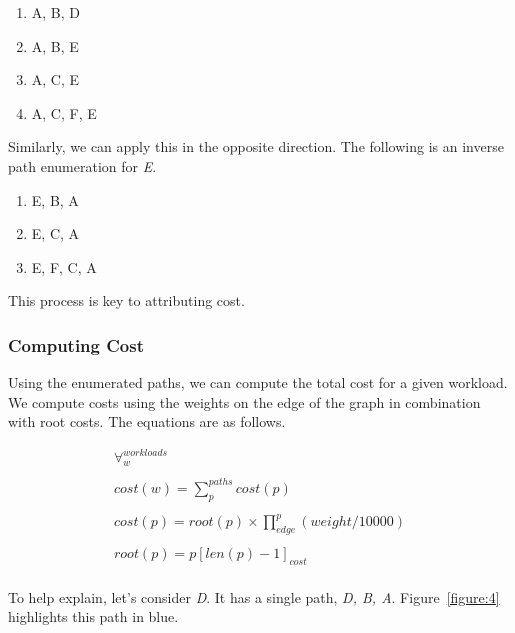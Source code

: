 \documentclass[10pt, a4paper, twocolumn]{article}
\begin{document}
      \begin{enumerate}
        \item A, B, D
        \item A, B, E
        \item A, C, E
        \item A, C, F, E
      \end{enumerate}

      Similarly, we can apply this in the opposite direction.
      The following is an inverse path enumeration for \textit{E}.

      \begin{enumerate}
        \item E, B, A
        \item E, C, A
        \item E, F, C, A
      \end{enumerate}

      This process is key to attributing cost.

    \subsubsection*{Computing Cost}
      Using the enumerated paths, we can compute the total cost for a given workload.
      We compute costs using the weights on the edge of the graph in combination with root costs.
      The equations are as follows.

      \begin{gather*}
        \forall^{workloads}_{w} \\
        \\
        cost(w) = \sum^{paths}_{p} cost(p) \\
        \\
        cost(p) = root(p) \times \prod^{p}_{edge} (weight / 10000) \\
        \\
        root(p) = p[len(p) - 1]_{cost} \\
      \end{gather*}

      To help explain, let's consider \textit{D}.
      It has a single path, \textit{D, B, A}.
      Figure~\ref{figure:4} highlights this path in blue.
\end{document}
